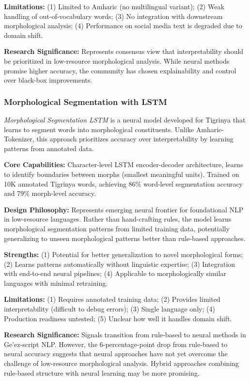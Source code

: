 \documentclass[12pt,a4paper]{article}
\theoremstyle{plain}
\theoremstyle{definition}
\begin{document}
\textbf{Limitations:} (1) Limited to Amharic (no multilingual variant); (2) Weak handling of out-of-vocabulary words; (3) No integration with downstream morphological analysis; (4) Performance on social media text is degraded due to domain shift.

\textbf{Research Significance:} Represents consensus view that interpretability should be prioritized in low-resource morphological analysis. While neural methods promise higher accuracy, the community has chosen explainability and control over black-box improvements.

\subsubsection{Morphological Segmentation with LSTM}

\textit{Morphological Segmentation LSTM} is a neural model developed for Tigrinya that learns to segment words into morphological constituents. Unlike Amharic-Tokenizer, this approach prioritizes accuracy over interpretability by learning patterns from annotated data.

\textbf{Core Capabilities:} Character-level LSTM encoder-decoder architecture, learns to identify boundaries between morphs (smallest meaningful units). Trained on 10K annotated Tigrinya words, achieving 86\% word-level segmentation accuracy and 79\% morph-level accuracy.

\textbf{Design Philosophy:} Represents emerging neural frontier for foundational NLP in low-resource languages. Rather than hand-crafting rules, the model learns morphological segmentation patterns from limited training data, potentially generalizing to unseen morphological patterns better than rule-based approaches.

\textbf{Strengths:} (1) Potential for better generalization to novel morphological forms; (2) Learns patterns automatically without linguistic expertise; (3) Integration with end-to-end neural pipelines; (4) Applicable to morphologically similar languages with minimal retraining.

\textbf{Limitations:} (1) Requires annotated training data; (2) Provides limited interpretability (difficult to debug errors); (3) Single language only; (4) Production readiness untested; (5) Unclear how well it handles domain shift.

\textbf{Research Significance:} Signals transition from rule-based to neural methods in Ge'ez-script NLP. However, the 6-percentage-point drop from rule-based to neural accuracy suggests that neural approaches have not yet overcome the challenge of low-resource morphological analysis. Hybrid approaches combining rule-based structure with neural learning may be more promising.
\end{document}
